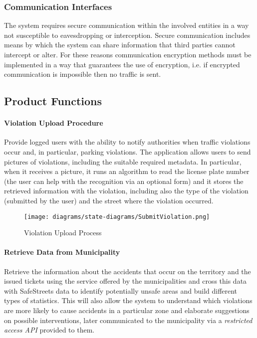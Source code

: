 \subsubsection{Communication Interfaces}
	The system requires secure communication within the involved entities in a way not susceptible to eavesdropping or interception. Secure communication includes means by which the system can share information that third parties cannot intercept or alter. For these reasons communication encryption methods must be implemented in a way that guarantees the use of encryption, i.e. if encrypted communication is impossible then no traffic is sent.

\subsection{Product Functions}
\paragraph{Violation Upload Procedure} 
Provide logged users with the ability to notify authorities when traffic violations occur and, in particular, parking violations. The application allows users to send pictures of violations, including the suitable required metadata. In particular, when it receives a picture, it runs an algorithm to read the license plate number (the user can help with the recognition via an optional form) and it stores the retrieved information with the violation, including also the type of the violation (submitted by the user) and the street where the violation occurred. \cite{Assignments}
\clearpage

	\begin{figure}[h]
		\centering
		\texttt{[image: diagrams/state-diagrams/SubmitViolation.png]}
		\caption{
			\label{fig:violationUpload} Violation Upload Process
		}
	\end{figure}
	
\paragraph{Retrieve Data from Municipality}
Retrieve the information about the accidents that occur on the territory and the issued tickets using the service offered by the municipalities and cross this data with SafeStreets data to identify potentially unsafe areas and build different types of statistics. This will also allow the system to understand which violations are more likely to cause accidents in a particular zone and elaborate suggestions on possible interventions, later communicated to the municipality via a \emph{restricted access API} provided to them. \cite{Assignments} \newline

